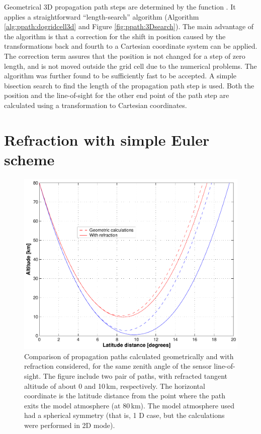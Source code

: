 Geometrical 3D propagation path steps are determined by the function
. It applies a straightforward
``length-search'' algorithm (Algorithm
\ref{alg:ppath:dogridcell3d} and Figure \ref{fig:ppath:3Dsearch}). The main
advantage of the algorithm is that a correction for the shift in position
caused by the transformations back and fourth to a Cartesian coordinate system
can be applied. The correction term assures that the position is not changed
for a step of zero length, and is not moved outside the grid cell due to the
numerical problems. The algorithm was further found to be sufficiently fast to
be accepted. A simple bisection search to find the length of the propagation
path step is used. Both the position and the line-of-sight for the other end
point of the path step are calculated using a transformation to Cartesian
coordinates.




\section{Refraction with simple Euler scheme}
\label{sec:ppath:refreuler}

\begin{figure}[tb!]
 \begin{center}
  \includegraphics*[width=0.70\hsize]{ppath_refr1}
  \caption{Comparison of propagation paths calculated geometrically and 
    with refraction considered, for the same zenith angle of the
    sensor line-of-sight. The figure include two pair of paths, with
    refracted tangent altitude of about 0 and 10\,km, respectively.
    The horizontal coordinate is the latitude distance from the point
    where the path exits the model atmosphere (at 80\,km). The model
    atmosphere used had a spherical symmetry (that is, 1 D case, but
    the calculations were performed in 2D mode).}
  \label{fig:ppath:ppath_refr1}  
 \end{center}
\end{figure}

